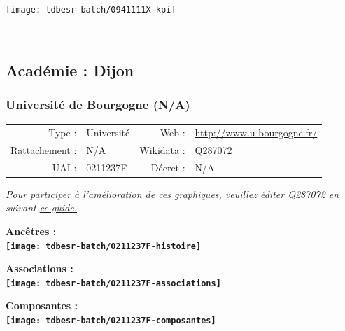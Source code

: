 \documentclass[12pt,french,]{article}
\begin{document}
\begin{center}\texttt{[image: tdbesr-batch/0941111X-kpi]} \end{center}\checkoddpage

\ifoddpage ~\newpage \fi   

\hypertarget{acaduxe9mie-dijon}{%
\subsection{Académie : Dijon}\label{acaduxe9mie-dijon}}

\hypertarget{universituxe9-de-bourgogne-na}{%
\subsubsection{Université de Bourgogne
(N/A)}\label{universituxe9-de-bourgogne-na}}

\begin{tabular*}{\textwidth}{rp{5cm}rl}  
\hline  
Type : & Université & Web : &\href{http://www.u-bourgogne.fr/}{http://www.u-bourgogne.fr/} \\  
Rattachement : & N/A & Wikidata : & \href{https://www.wikidata.org/entity/Q287072}{Q287072} \\  
UAI : & 0211237F & Décret : & N/A \\  
\hline  
\end{tabular*}

\textit{\scriptsize Pour participer à l'amélioration de ces graphiques, veuillez éditer  \href{https://www.wikidata.org/entity/Q287072}{Q287072}  en suivant \href{https://github.com/cpesr/wikidataESR/blob/master/Rmd/wikidataESR.md}{ce guide.}}

\vspace{1cm}  
\begin{minipage}[b]{0.50\textwidth}\begin{center} \bf Ancêtres : \\  
\texttt{[image: tdbesr-batch/0211237F-histoire]} \end{center}\end{minipage}\begin{minipage}[b]{0.50\textwidth}\begin{center} \bf Associations : \\  
\texttt{[image: tdbesr-batch/0211237F-associations]} \end{center}\end{minipage}

\hrulefill

\begin{center} \bf Composantes : \\  
\texttt{[image: tdbesr-batch/0211237F-composantes]} \end{center}
\end{document}
